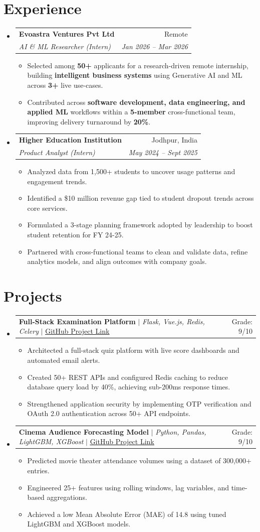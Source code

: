 \documentclass[letterpaper,11pt]{article}
\makeatletter
\newcommand{\resumeItem}[1]{
  \item\small{
    {#1 \vspace{-2pt}}
  }
}
\newcommand{\resumeSubheading}[4]{
  \vspace{-2pt}\item
    \begin{tabular*}{0.97\textwidth}[t]{l@{\extracolsep{\fill}}r}
      \textbf{#1} & #2 \\
      \textit{\small#3} & \textit{\small #4} \\
    \end{tabular*}\vspace{-7pt}
}
\newcommand{\resumeProjectHeading}[2]{
    \item
    \begin{tabular*}{0.97\textwidth}{l@{\extracolsep{\fill}}r}
      \small#1 & #2 \\
    \end{tabular*}\vspace{-7pt}
}
\newcommand{\resumeSubHeadingListStart}{\begin{itemize}[leftmargin=0.15in, label={}]}
\newcommand{\resumeSubHeadingListEnd}{\end{itemize}}
\newcommand{\resumeItemListStart}{\begin{itemize}[label=--]}
\newcommand{\resumeItemListEnd}{\end{itemize}\vspace{-5pt}}
\makeatother
\begin{document}
\section{Experience}
  \resumeSubHeadingListStart
    \resumeSubheading
      {Evoastra Ventures Pvt Ltd}{Remote}
      {AI \& ML Researcher (Intern)}{Jan 2026 -- Mar 2026}
      \resumeItemListStart
        \resumeItem{Selected among \textbf{50+} applicants for a research-driven remote internship, building \textbf{intelligent business systems} using Generative AI and ML across \textbf{3+} live use-cases.}
        \resumeItem{Contributed across \textbf{software development, data engineering, and applied ML} workflows within a \textbf{5-member} cross-functional team, improving delivery turnaround by \textbf{20\%}.}
      \resumeItemListEnd
    \resumeSubheading
      {Higher Education Institution}{Jodhpur, India}
      {Product Analyst (Intern)}{May 2024 -- Sept 2025}
      \resumeItemListStart
        \resumeItem{Analyzed data from 1,500+ students to uncover usage patterns and engagement trends.}
        \resumeItem{Identified a \$10 million revenue gap tied to student dropout trends across core services.}
        \resumeItem{Formulated a 3-stage planning framework adopted by leadership to boost student retention for FY 24-25.}
        \resumeItem{Partnered with cross-functional teams to clean and validate data, refine analytics models, and align outcomes with company goals.}
      \resumeItemListEnd
  \resumeSubHeadingListEnd

\section{Projects}
  \resumeSubHeadingListStart
    \resumeProjectHeading
      {\textbf{Full-Stack Examination Platform} $|$ \emph{Flask, Vue.js, Redis, Celery} $|$ \href{https://github.com/daiwik-project}{\underline{GitHub Project Link}}}{Grade: 9/10}
      \resumeItemListStart
        \resumeItem{Architected a full-stack quiz platform with live score dashboards and automated email alerts.}
        \resumeItem{Created 50+ REST APIs and configured Redis caching to reduce database query load by 40\%, achieving sub-200ms response times.}
        \resumeItem{Strengthened application security by implementing OTP verification and OAuth 2.0 authentication across 50+ API endpoints.}
      \resumeItemListEnd
    \resumeProjectHeading
      {\textbf{Cinema Audience Forecasting Model} $|$ \emph{Python, Pandas, LightGBM, XGBoost} $|$ \href{https://github.com/daiwik-project}{\underline{GitHub Project Link}}}{Grade: 9/10}
      \resumeItemListStart
        \resumeItem{Predicted movie theater attendance volumes using a dataset of 300,000+ entries.}
        \resumeItem{Engineered 25+ features using rolling windows, lag variables, and time-based aggregations.}
        \resumeItem{Achieved a low Mean Absolute Error (MAE) of 14.8 using tuned LightGBM and XGBoost models.}
      \resumeItemListEnd
  \resumeSubHeadingListEnd
\end{document}
